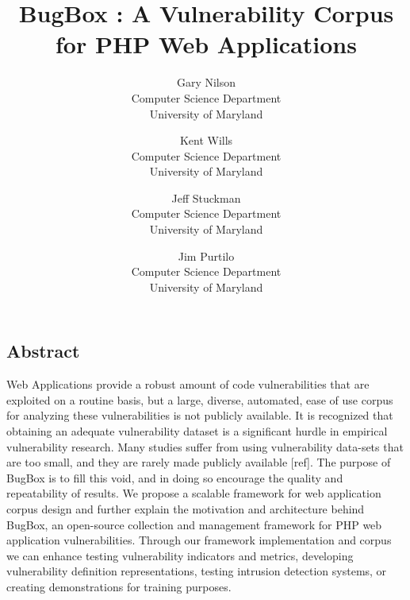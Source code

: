 \documentclass[letterpaper,twocolumn,10pt]{article}
\begin{document}
\date{}


\title{\Large \bf BugBox : A Vulnerability Corpus for PHP Web Applications}


\author{
{\rm Gary Nilson}\\
Computer Science Department\\University of Maryland
\and
{\rm Kent Wills}\\
Computer Science Department\\University of Maryland
\and
{\rm Jeff Stuckman}\\
Computer Science Department\\University of Maryland
\and
{\rm Jim Purtilo}\\
Computer Science Department\\University of Maryland
} %

\maketitle

\thispagestyle{empty}

\subsection*{Abstract}

Web Applications provide a robust amount of code vulnerabilities that are exploited on a routine basis, but a large, diverse, automated, ease of use corpus for analyzing these vulnerabilities is not publicly available.   It is recognized that obtaining an adequate vulnerability dataset is a significant hurdle in empirical vulnerability research.  Many studies suffer from using vulnerability data-sets that are too small, and they are rarely made publicly available [ref].  The purpose of BugBox is to fill this void, and in doing so encourage the quality and repeatability of results.  We propose a scalable framework for web application corpus design and further explain the motivation and architecture behind BugBox, an open-source collection and management framework for PHP web application vulnerabilities.  Through our framework implementation and corpus we can enhance testing vulnerability indicators and metrics, developing vulnerability definition representations, testing intrusion detection systems, or creating demonstrations for training purposes.  
\end{document}
